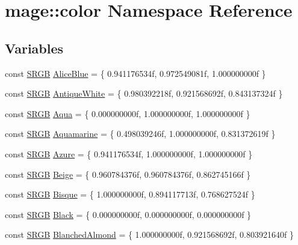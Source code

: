 \hypertarget{namespacemage_1_1color}{}\section{mage\+:\+:color Namespace Reference}
\label{namespacemage_1_1color}
\subsection*{Variables}
\begin{DoxyCompactItemize}
\item 
const \hyperlink{structmage_1_1_s_r_g_b}{S\+R\+GB} \hyperlink{namespacemage_1_1color_a03d390fe7b0d4ca9bf7800de2e8396f8}{Alice\+Blue} = \{ 0.\+941176534f, 0.\+972549081f, 1.\+000000000f \}
\item 
const \hyperlink{structmage_1_1_s_r_g_b}{S\+R\+GB} \hyperlink{namespacemage_1_1color_a78d58145e7293782912e3806bce43059}{Antique\+White} = \{ 0.\+980392218f, 0.\+921568692f, 0.\+843137324f \}
\item 
const \hyperlink{structmage_1_1_s_r_g_b}{S\+R\+GB} \hyperlink{namespacemage_1_1color_ab385e0cab02efdce031a572e099f2d63}{Aqua} = \{ 0.\+000000000f, 1.\+000000000f, 1.\+000000000f \}
\item 
const \hyperlink{structmage_1_1_s_r_g_b}{S\+R\+GB} \hyperlink{namespacemage_1_1color_ab3cece3a6dac9ae00256df815206c0aa}{Aquamarine} = \{ 0.\+498039246f, 1.\+000000000f, 0.\+831372619f \}
\item 
const \hyperlink{structmage_1_1_s_r_g_b}{S\+R\+GB} \hyperlink{namespacemage_1_1color_aea8fcbc7898b52bbd11451a8ab02ab3c}{Azure} = \{ 0.\+941176534f, 1.\+000000000f, 1.\+000000000f \}
\item 
const \hyperlink{structmage_1_1_s_r_g_b}{S\+R\+GB} \hyperlink{namespacemage_1_1color_aa01771f207dd193a3c3115a1729d6aa1}{Beige} = \{ 0.\+960784376f, 0.\+960784376f, 0.\+862745166f \}
\item 
const \hyperlink{structmage_1_1_s_r_g_b}{S\+R\+GB} \hyperlink{namespacemage_1_1color_a7c22f62280a9efea3170feea8c99b19f}{Bisque} = \{ 1.\+000000000f, 0.\+894117713f, 0.\+768627524f \}
\item 
const \hyperlink{structmage_1_1_s_r_g_b}{S\+R\+GB} \hyperlink{namespacemage_1_1color_ac95e41f0ea0c7c9325356ec5527f789b}{Black} = \{ 0.\+000000000f, 0.\+000000000f, 0.\+000000000f \}
\item 
const \hyperlink{structmage_1_1_s_r_g_b}{S\+R\+GB} \hyperlink{namespacemage_1_1color_a23e575bdc273602ef9b6a0bee3da6650}{Blanched\+Almond} = \{ 1.\+000000000f, 0.\+921568692f, 0.\+803921640f \}

\end{DoxyCompactItemize}

